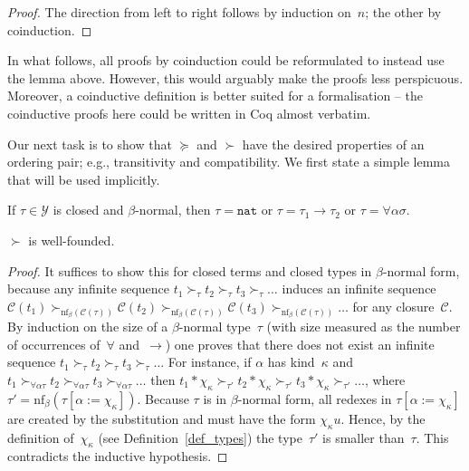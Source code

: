 \documentclass[a4paper,UKenglish,cleveref,autoref,numberwithinsect]{lipics-v2019}
\theoremstyle{definition}
\newcommand{\ITypes}{\mathcal{Y}}
\newcommand{\arrtype}{\rightarrow}
\newcommand{\tapp}[2]{#1 * #2}
\newcommand{\subst}[2]{#1:=#2}
\newcommand{\nat}{\mathtt{nat}}
\newcommand{\cl}{\mathcal{C}}
\newcommand{\nf}{\mathrm{nf}}
\begin{document}
\begin{proof}
  The direction from left to right follows by induction on~$n$; the
  other by coinduction.
\end{proof}

In what follows, all proofs by coinduction could be reformulated to
instead use the lemma above. However, this would arguably make the
proofs less perspicuous. Moreover, a coinductive definition is better
suited for a formalisation -- the coinductive proofs here could be
written in Coq almost verbatim.

Our next task is to show that $\succeq$ and $\succ$ have the
desired properties of an ordering pair; e.g., transitivity and
compatibility. We first state a simple lemma that will be used
implicitly.

\begin{lemma}
  If $\tau \in \ITypes$ is closed and $\beta$-normal, then
  $\tau = \nat$ or $\tau = \tau_1\arrtype\tau_2$ or
  $\tau = \forall\alpha\sigma$.
\end{lemma}


\begin{lemma}\label{lem_well_founded}
  $\succ$ is well-founded.
\end{lemma}

\begin{proof}
  It suffices to show this for closed terms and closed types in
  $\beta$-normal form, because any infinite sequence $t_1 \succ_\tau
  t_2 \succ_\tau t_3 \succ_\tau \ldots$ induces an infinite sequence
  $\cl(t_1) \succ_{\nf_\beta(\cl(\tau))} \cl(t_2)
  \succ_{\nf_\beta(\cl(\tau))} \cl(t_3) \succ_{\nf_\beta(\cl(\tau))}
  \ldots$ for any closure~$\cl$. By induction on the size of a
  $\beta$-normal type~$\tau$ (with size measured as the number of
  occurrences of~$\forall$ and~$\arrtype$) one proves that there does
  not exist an infinite sequence $t_1 \succ_\tau t_2 \succ_\tau t_3
  \succ_\tau \ldots$ For instance, if $\alpha$ has kind~$\kappa$ and
  $t_1 \succ_{\forall\alpha\tau} t_2 \succ_{\forall\alpha\tau} t_3
  \succ_{\forall\alpha\tau} \ldots$ then $\tapp{t_1}{\chi_\kappa}
  \succ_{\tau'} \tapp{t_2}{\chi_\kappa} \succ_{\tau'}
  \tapp{t_3}{\chi_\kappa} \succ_{\tau'} \ldots$, where
  $\tau'=\nf_\beta(\tau[\subst{\alpha}{\chi_\kappa}])$. Because $\tau$
  is in $\beta$-normal form, all redexes in
  $\tau[\subst{\alpha}{\chi_\kappa}]$ are created by the substitution
  and must have the form $\chi_\kappa u$. Hence, by the definition
  of~$\chi_\kappa$ (see Definition~\ref{def_types}) the
  type~$\tau'$ is smaller than~$\tau$. This
  contradicts the inductive hypothesis.
\end{proof}
\end{document}
